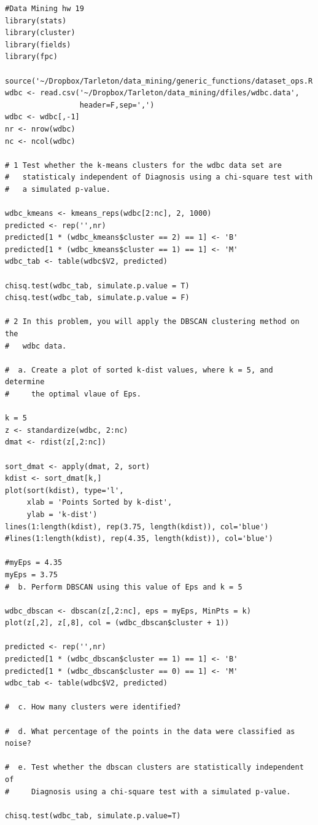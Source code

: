 \documentclass[11pt]{article}
\begin{document}
\begin{Verbatim}
#Data Mining hw 19
library(stats)
library(cluster)
library(fields)
library(fpc)

source('~/Dropbox/Tarleton/data_mining/generic_functions/dataset_ops.R')
wdbc <- read.csv('~/Dropbox/Tarleton/data_mining/dfiles/wdbc.data',
                 header=F,sep=',')
wdbc <- wdbc[,-1]
nr <- nrow(wdbc) 
nc <- ncol(wdbc) 

# 1 Test whether the k-means clusters for the wdbc data set are 
#   statisticaly independent of Diagnosis using a chi-square test with 
#   a simulated p-value.

wdbc_kmeans <- kmeans_reps(wdbc[2:nc], 2, 1000)
predicted <- rep('',nr)
predicted[1 * (wdbc_kmeans$cluster == 2) == 1] <- 'B'
predicted[1 * (wdbc_kmeans$cluster == 1) == 1] <- 'M'
wdbc_tab <- table(wdbc$V2, predicted)

chisq.test(wdbc_tab, simulate.p.value = T)
chisq.test(wdbc_tab, simulate.p.value = F)

# 2 In this problem, you will apply the DBSCAN clustering method on the 
#   wdbc data. 

#  a. Create a plot of sorted k-dist values, where k = 5, and determine 
#     the optimal vlaue of Eps. 

k = 5
z <- standardize(wdbc, 2:nc)
dmat <- rdist(z[,2:nc])

sort_dmat <- apply(dmat, 2, sort)
kdist <- sort_dmat[k,]
plot(sort(kdist), type='l', 
     xlab = 'Points Sorted by k-dist', 
     ylab = 'k-dist')
lines(1:length(kdist), rep(3.75, length(kdist)), col='blue')
#lines(1:length(kdist), rep(4.35, length(kdist)), col='blue')

#myEps = 4.35
myEps = 3.75
#  b. Perform DBSCAN using this value of Eps and k = 5

wdbc_dbscan <- dbscan(z[,2:nc], eps = myEps, MinPts = k)
plot(z[,2], z[,8], col = (wdbc_dbscan$cluster + 1))

predicted <- rep('',nr)
predicted[1 * (wdbc_dbscan$cluster == 1) == 1] <- 'B'
predicted[1 * (wdbc_dbscan$cluster == 0) == 1] <- 'M'
wdbc_tab <- table(wdbc$V2, predicted)

#  c. How many clusters were identified? 

#  d. What percentage of the points in the data were classified as noise? 

#  e. Test whether the dbscan clusters are statistically independent of 
#     Diagnosis using a chi-square test with a simulated p-value. 

chisq.test(wdbc_tab, simulate.p.value=T)
\end{Verbatim}
\end{document}

